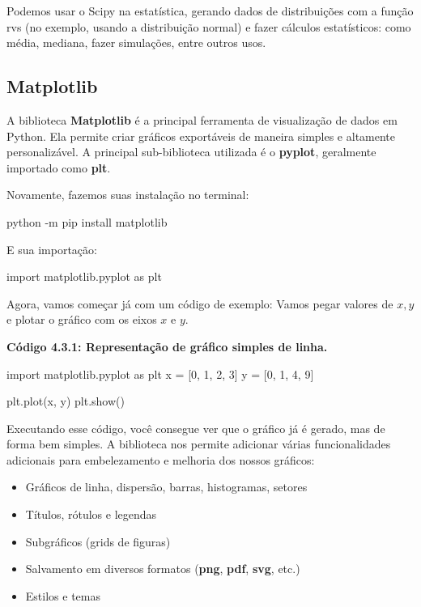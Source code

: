\documentclass[11pt, a4paper]{article}
\begin{document}
Podemos usar o Scipy na estatística, gerando dados de distribuições com a função rvs (no exemplo, usando a distribuição normal) e fazer cálculos estatísticos: como média, mediana, fazer simulações, entre outros usos.

\void[-0.4]

\subsection{Matplotlib}

A biblioteca \textbf{Matplotlib} é a principal ferramenta de visualização de dados em Python. Ela permite criar gráficos exportáveis de maneira simples e altamente personalizável. A principal sub-biblioteca utilizada é o \textbf{pyplot}, geralmente importado como \textbf{plt}.

Novamente, fazemos suas instalação no terminal:
\begin{code}
python -m pip install matplotlib
\end{code}

E sua importação:
\begin{code}
import matplotlib.pyplot as plt
\end{code}

Agora, vamos começar já com um código de exemplo: Vamos pegar valores de \(x,y\) e plotar o gráfico com os eixos \(x\) e \(y\).

\textbf{Código 4.3.1: Representação de gráfico simples de linha.}

\begin{code}
import matplotlib.pyplot as plt
x = [0, 1, 2, 3]
y = [0, 1, 4, 9]

plt.plot(x, y)
plt.show()
\end{code}

Executando esse código, você consegue ver que o gráfico já é gerado, mas de forma bem simples. A biblioteca nos permite adicionar várias funcionalidades adicionais para embelezamento e melhoria dos nossos gráficos:

\begin{itemize}
    \item Gráficos de linha, dispersão, barras, histogramas, setores
    \item Títulos, rótulos e legendas
    \item Subgráficos (grids de figuras)
    \item Salvamento em diversos formatos (\textbf{png}, \textbf{pdf}, \textbf{svg}, etc.)
    \item Estilos e temas
\end{itemize}
\end{document}
